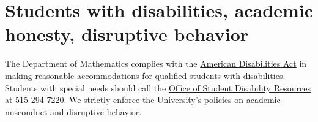 \documentclass[11pt]{article}
\begin{document}
\section{Students with disabilities, academic honesty, disruptive behavior}
The Department of Mathematics complies with the 
\href{http://www.ada.gov}{American Disabilities Act} in making reasonable 
accommodations for qualified students with disabilities.  Students with 
special needs should call the 
\href{http://www.dso.iastate.edu/dr}{Office of Student Disability Resources} at
515-294-7220.
We strictly enforce the University's policies on 
\href{http://www.dso.iastate.edu/ja/academic/misconduct}{academic misconduct}
and \href{http://www.dso.iastate.edu/sa/issuesconcerns/disruption}
{disruptive behavior}.
\end{document}
